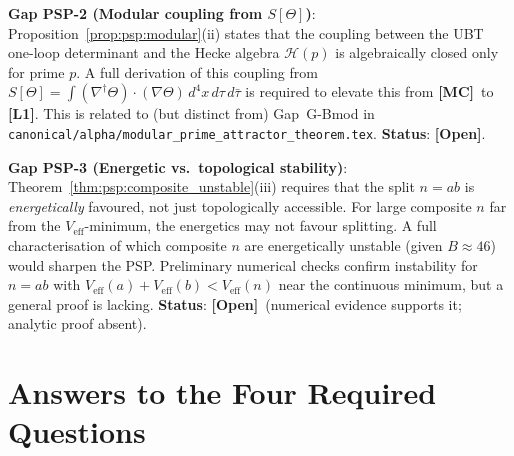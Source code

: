 \documentclass[12pt,a4paper]{article}
\theoremstyle{definition}
\theoremstyle{remark}
\newcommand{\OPEN}{\textbf{[Open]}}
\newcommand{\MC}{\textbf{[MC]}}
\newcommand{\Lone}{\textbf{[L1]}}
\begin{document}
\begin{gapbox}
\textbf{Gap PSP-2 (Modular coupling from $S[\Theta]$)}:
Proposition~\ref{prop:psp:modular}(ii) states that the coupling between the
UBT one-loop determinant and the Hecke algebra $\mathcal{H}(p)$ is algebraically
closed only for prime $p$.  A full derivation of this coupling from
$S[\Theta] = \int (\nabla^\dagger\Theta)\cdot(\nabla\Theta)\,d^4x\,d\tau\,d\bar\tau$
is required to elevate this from \MC\ to \Lone.
This is related to (but distinct from) Gap~G-Bmod in
\texttt{canonical/alpha/modular\_prime\_attractor\_theorem.tex}.
\textbf{Status}: \OPEN.
\end{gapbox}

\begin{gapbox}
\textbf{Gap PSP-3 (Energetic vs.\ topological stability)}:
Theorem~\ref{thm:psp:composite_unstable}(iii) requires that the split
$n = ab$ is \emph{energetically} favoured, not just topologically accessible.
For large composite $n$ far from the $V_{\mathrm{eff}}$-minimum, the energetics
may not favour splitting.  A full characterisation of which composite $n$ are
energetically unstable (given $B \approx 46$) would sharpen the PSP.
Preliminary numerical checks confirm instability for $n = ab$ with
$V_{\mathrm{eff}}(a) + V_{\mathrm{eff}}(b) < V_{\mathrm{eff}}(n)$ near the
continuous minimum, but a general proof is lacking.
\textbf{Status}: \OPEN\ (numerical evidence supports it; analytic proof absent).
\end{gapbox}

\section{Answers to the Four Required Questions}
\label{sec:psp:answers}
\end{document}
